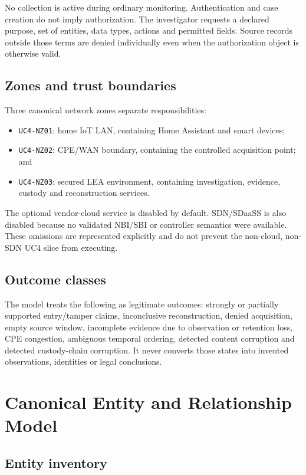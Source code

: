 ﻿\documentclass[11pt,a4paper]{article}
\newcommand{\code}[1]{\texttt{#1}}
\begin{document}
No collection is active during ordinary monitoring. Authentication and case creation do not imply authorization. The investigator requests a declared purpose, set of entities, data types, actions and permitted fields. Source records outside those terms are denied individually even when the authorization object is otherwise valid.

\subsection{Zones and trust boundaries}

Three canonical network zones separate responsibilities:

\begin{itemize}
  \item \code{UC4-NZ01}: home IoT LAN, containing Home Assistant and smart devices;
  \item \code{UC4-NZ02}: CPE/WAN boundary, containing the controlled acquisition point; and
  \item \code{UC4-NZ03}: secured LEA environment, containing investigation, evidence, custody and reconstruction services.
\end{itemize}

The optional vendor-cloud service is disabled by default. SDN/SDaaSS is also disabled because no validated NBI/SBI or controller semantics were available. These omissions are represented explicitly and do not prevent the non-cloud, non-SDN UC4 slice from executing.

\subsection{Outcome classes}

The model treats the following as legitimate outcomes: strongly or partially supported entry/tamper claims, inconclusive reconstruction, denied acquisition, empty source window, incomplete evidence due to observation or retention loss, CPE congestion, ambiguous temporal ordering, detected content corruption and detected custody-chain corruption. It never converts those states into invented observations, identities or legal conclusions.

\section{Canonical Entity and Relationship Model}

\subsection{Entity inventory}
\end{document}
